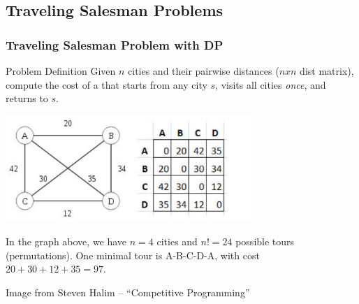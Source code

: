 \documentclass{beamer}
\begin{document}
\subsection{Traveling Salesman Problems}
\begin{frame}
  \frametitle{Traveling Salesman Problem with DP}

  {\smaller
  \begin{block}{Problem Definition}
    Given $n$ cities and their pairwise distances ($n x n$ dist
    matrix), compute the cost of a  that starts from
    any city $s$, visits all cities \emph{once}, and returns to $s$.
  \end{block}
  \begin{center}
    \includegraphics[width=0.7\textwidth]{../img/tsp_example}
  \end{center}

  In the graph above, we have $n=4$ cities and $n! = 24$ possible
  tours (permutations). One minimal tour is A-B-C-D-A, with cost
  $20+30+12+35=97$.
  }
  
  \hrulefill

  \hfill{\tiny Image from Steven Halim -- ``Competitive Programming''}
  
\end{frame}
\end{document}
